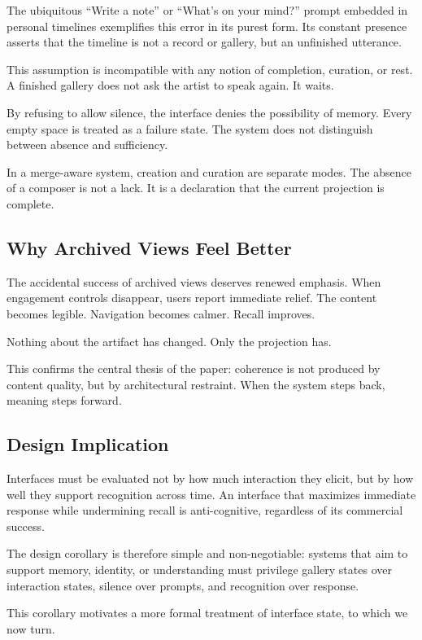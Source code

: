 \documentclass[11pt,oneside]{article}
\begin{document}
The ubiquitous “Write a note” or “What’s on your mind?” prompt embedded in personal timelines exemplifies this error in its purest form. Its constant presence asserts that the timeline is not a record or gallery, but an unfinished utterance.

This assumption is incompatible with any notion of completion, curation, or rest. A finished gallery does not ask the artist to speak again. It waits.

By refusing to allow silence, the interface denies the possibility of memory. Every empty space is treated as a failure state. The system does not distinguish between absence and sufficiency.

In a merge-aware system, creation and curation are separate modes. The absence of a composer is not a lack. It is a declaration that the current projection is complete.

\subsection{Why Archived Views Feel Better}

The accidental success of archived views deserves renewed emphasis. When engagement controls disappear, users report immediate relief. The content becomes legible. Navigation becomes calmer. Recall improves.

Nothing about the artifact has changed. Only the projection has.

This confirms the central thesis of the paper: coherence is not produced by content quality, but by architectural restraint. When the system steps back, meaning steps forward.

\subsection{Design Implication}

Interfaces must be evaluated not by how much interaction they elicit, but by how well they support recognition across time. An interface that maximizes immediate response while undermining recall is anti-cognitive, regardless of its commercial success.

The design corollary is therefore simple and non-negotiable: systems that aim to support memory, identity, or understanding must privilege gallery states over interaction states, silence over prompts, and recognition over response.

This corollary motivates a more formal treatment of interface state, to which we now turn.
\end{document}
